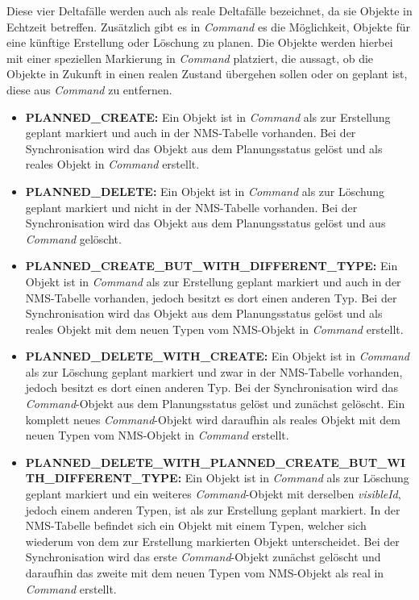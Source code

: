 Diese vier Deltafälle werden auch als reale Deltafälle bezeichnet, da sie Objekte in Echtzeit betreffen. Zusätzlich gibt es in \textit{Command} es die Möglichkeit, Objekte für eine künftige Erstellung oder Löschung zu planen. Die Objekte werden hierbei mit einer speziellen Markierung in \textit{Command} platziert, die aussagt, ob die Objekte in Zukunft in einen realen Zustand übergehen sollen oder on geplant ist, diese aus \textit{Command} zu entfernen. 

\begin{itemize}
    \item \textbf{PLANNED\_CREATE:} Ein Objekt ist in \textit{Command} als zur Erstellung geplant markiert und auch in der \ac{NMS}-Tabelle vorhanden. Bei der Synchronisation wird das Objekt aus dem Planungsstatus gelöst und als reales Objekt in \textit{Command} erstellt.
    \item \textbf{PLANNED\_DELETE:} Ein Objekt ist in \textit{Command} als zur Löschung geplant markiert und nicht in der \ac{NMS}-Tabelle vorhanden. Bei der Synchronisation wird das Objekt aus dem Planungsstatus gelöst und aus \textit{Command} gelöscht.
    \item \textbf{PLANNED\_CREATE\_BUT\_WITH\_DIFFERENT\_TYPE:} Ein Objekt ist in \textit{Command} als zur Erstellung geplant markiert und auch in der \ac{NMS}-Tabelle vorhanden, jedoch besitzt es dort einen anderen Typ. Bei der Synchronisation wird das Objekt aus dem Planungsstatus gelöst und als reales Objekt mit dem neuen Typen vom \ac{NMS}-Objekt in \textit{Command} erstellt.
    \item \textbf{PLANNED\_DELETE\_WITH\_CREATE:} Ein Objekt ist in \textit{Command} als zur Löschung geplant markiert und zwar in der \ac{NMS}-Tabelle vorhanden, jedoch besitzt es dort einen anderen Typ. Bei der Synchronisation wird das \textit{Command}-Objekt aus dem Planungsstatus gelöst und zunächst gelöscht. Ein komplett neues \textit{Command}-Objekt wird daraufhin als reales Objekt mit dem neuen Typen vom \ac{NMS}-Objekt in \textit{Command} erstellt.
    \item \textbf{PLANNED\_DELETE\_WITH\_PLANNED\_CREATE\_BUT\_WITH\_\newline DIFFERENT\_TYPE:} Ein Objekt ist in \textit{Command} als zur Löschung geplant markiert und ein weiteres \textit{Command}-Objekt mit derselben \textit{visibleId}, jedoch einem anderen Typen, ist als zur Erstellung geplant markiert. In der \ac{NMS}-Tabelle befindet sich ein Objekt mit einem Typen, welcher sich wiederum von dem zur Erstellung markierten Objekt unterscheidet. Bei der Synchronisation wird das erste \textit{Command}-Objekt zunächst gelöscht und daraufhin das zweite mit dem neuen Typen vom \ac{NMS}-Objekt als real in \textit{Command} erstellt.

\end{itemize}
